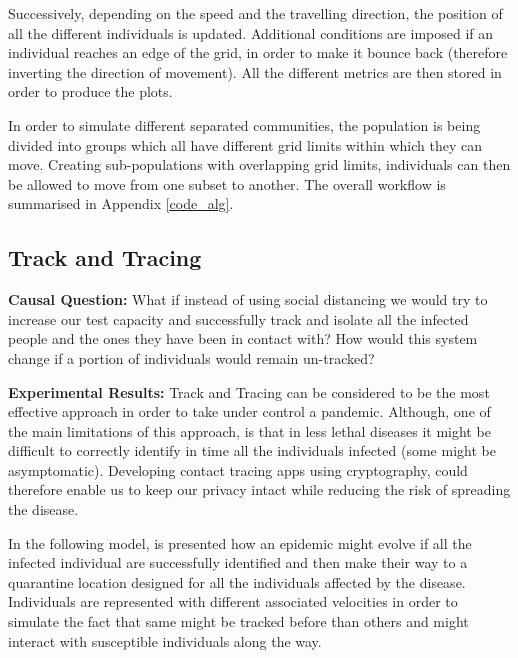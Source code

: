 Successively, depending on the speed and the travelling direction, the position of all the different individuals is updated. Additional conditions are imposed if an individual reaches an edge of the grid, in order to make it bounce back (therefore inverting the direction of movement). All the different metrics are then stored in order to produce the plots.

In order to simulate different separated communities, the population is being divided into groups which all have different grid limits within which they can move. Creating sub-populations with overlapping grid limits, individuals can then be allowed to move from one subset to another. The overall workflow is summarised in Appendix \ref{code_alg}.

\subsection{Track and Tracing}

\textbf{Causal Question:} What if instead of using social distancing we would try to increase our test capacity and successfully track and isolate all the infected people and the ones they have been in contact with? How would this system change if a portion of individuals would remain un-tracked?

\textbf{Experimental Results:} Track and Tracing can be considered to be the most effective approach in order to take under control a pandemic. Although, one of the main limitations of this approach, is that in less lethal diseases it might be difficult to correctly identify in time all the individuals infected (some might be asymptomatic). Developing contact tracing apps using cryptography, could therefore enable us to keep our privacy intact while reducing the risk of spreading the disease.

In the following model, is presented how an epidemic might evolve if all the infected individual are successfully identified and then make their way to a quarantine location designed for all the individuals affected by the disease. Individuals are represented with different associated velocities in order to simulate the fact that same might be tracked before than others and might interact with susceptible individuals along the way.


